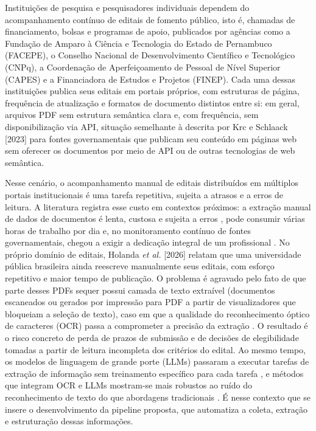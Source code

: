 \documentclass[12pt]{article}
\begin{document}
  Instituições de pesquisa e pesquisadores individuais dependem do acompanhamento contínuo de editais de fomento público, isto é, chamadas de financiamento, bolsas e programas de apoio, publicados por agências como a Fundação de Amparo à Ciência e Tecnologia do Estado de Pernambuco (FACEPE), o Conselho Nacional de Desenvolvimento Científico e Tecnológico (CNPq), a Coordenação de Aperfeiçoamento de Pessoal de Nível Superior (CAPES) e a Financiadora de Estudos e Projetos (FINEP). Cada uma dessas instituições publica seus editais em portais próprios, com estruturas de página, frequência de atualização e formatos de documento distintos entre si: em geral, arquivos PDF sem estrutura semântica clara \cite{b4} e, com frequência, sem disponibilização via API, situação semelhante à descrita por Krc e Schlaack [2023] para fontes governamentais que publicam seu conteúdo em páginas web sem oferecer os documentos por meio de API ou de outras tecnologias de web semântica.

  Nesse cenário, o acompanhamento manual de editais distribuídos em múltiplos portais institucionais é uma tarefa repetitiva, sujeita a atrasos e a erros de leitura. A literatura registra esse custo em contextos próximos: a extração manual de dados de documentos é lenta, custosa e sujeita a erros \cite{b4}, pode consumir várias horas de trabalho por dia \cite{b6} e, no monitoramento contínuo de fontes governamentais, chegou a exigir a dedicação integral de um profissional \cite{b3}. No próprio domínio de editais, Holanda \emph{et al.} [2026] relatam que uma universidade pública brasileira ainda reescreve manualmente seus editais, com esforço repetitivo e maior tempo de publicação. O problema é agravado pelo fato de que parte desses PDFs sequer possui camada de texto extraível (documentos escaneados ou gerados por impressão para PDF a partir de visualizadores que bloqueiam a seleção de texto), caso em que a qualidade do reconhecimento óptico de caracteres (OCR) passa a comprometer a precisão da extração \cite{b9}. O resultado é o risco concreto de perda de prazos de submissão e de decisões de elegibilidade tomadas a partir de leitura incompleta dos critérios do edital. Ao mesmo tempo, os modelos de linguagem de grande porte (LLMs) passaram a executar tarefas de extração de informação sem treinamento específico para cada tarefa \cite{b4,b7}, e métodos que integram OCR e LLMs mostram-se mais robustos ao ruído do reconhecimento de texto do que abordagens tradicionais \cite{b6}. É nesse contexto que se insere o desenvolvimento da pipeline proposta, que automatiza a coleta, extração e estruturação dessas informações.
\end{document}
